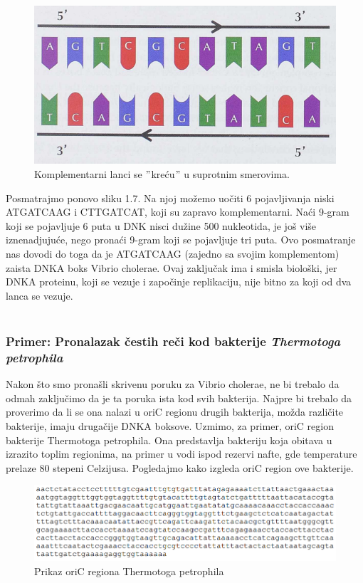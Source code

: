 \begin{figure}[h]
\caption{Komplementarni lanci se $"$kreću$"$ u suprotnim smerovima.}
\centering
\includegraphics[width=1\textwidth]{poglavlja/1/slike/Komplementarni.png}
\end{figure} 

Posmatrajmo ponovo sliku 1.7. Na njoj možemo uočiti 6 pojavljivanja niski ATGATCAAG i CTTGATCAT, koji su zapravo komplementarni. Naći 9-gram koji se pojavljuje 6 puta u DNK nisci dužine 500 nukleotida, je još više iznenadjujuće, nego pronaći 9-gram koji se pojavljuje tri puta. Ovo posmatranje nas dovodi do toga da je ATGATCAAG (zajedno sa svojim komplementom) zaista DNKA boks Vibrio cholerae. Ovaj zaključak ima i smisla biološki, jer DNKA proteinu, koji se vezuje i započinje replikaciju, nije bitno za koji od dva lanca se vezuje.\\\\

\subsubsection{Primer: Pronalazak čestih reči kod bakterije \textit{Thermotoga petrophila}} 

Nakon što smo pronašli skrivenu poruku za Vibrio cholerae, ne bi trebalo da odmah zaključimo da je ta poruka ista kod svih bakterija. Najpre bi trebalo da proverimo da li se ona nalazi u oriC regionu drugih bakterija, možda različite bakterije, imaju drugačije DNKA boksove. Uzmimo, za primer, oriC region bakterije Thermotoga petrophila. Ona predstavlja bakteriju koja obitava u izrazito toplim regionima, na primer u vodi ispod rezervi nafte, gde temperature prelaze 80 stepeni Celzijusa. Pogledajmo kako izgleda oriC region ove bakterije.

\begin{figure}[h]
\caption{Prikaz oriC regiona Thermotoga petrophila}
\centering
\includegraphics[width=1\textwidth]{poglavlja/1/slike/OriC_TP.png}
\end{figure} 

